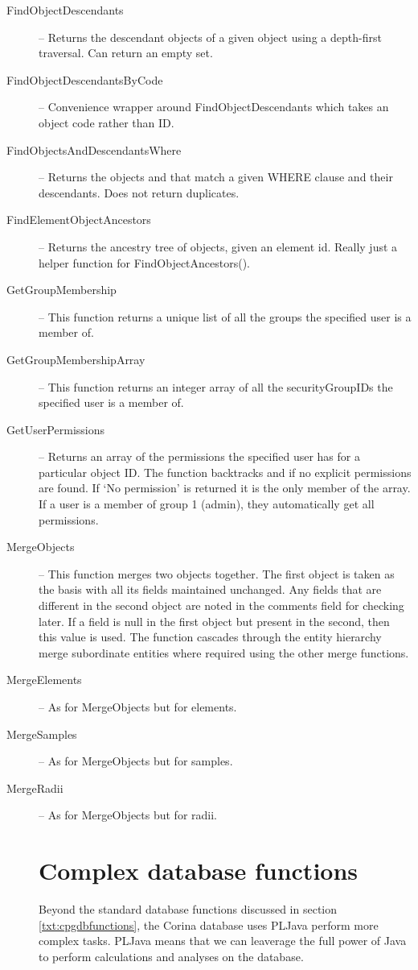 \begin{description}
 \item[FindObjectDescendants] -- Returns the descendant objects of a given object using a depth-first traversal. Can return an empty set. 

 \item[FindObjectDescendantsByCode] -- Convenience wrapper around FindObjectDescendants which takes an object code rather than ID.

 \item[FindObjectsAndDescendantsWhere] -- Returns the objects and that match a given WHERE clause and their descendants. Does not return duplicates. 

 \item[FindElementObjectAncestors] -- Returns the ancestry tree of objects, given an element id. Really just a helper function for FindObjectAncestors(). 

 \item[GetGroupMembership] -- This function returns a unique list of all the groups the specified user is a member of. 

 \item[GetGroupMembershipArray] -- This function returns an integer array of all the securityGroupIDs the specified user is a member of. 

 \item[GetUserPermissions] -- Returns an array of the permissions the specified user has for a particular object ID. The function backtracks  and  if no explicit permissions are found. If `No permission' is returned it is the only member of the array. If a user is a member of group 1 (admin), they automatically get all permissions. 

 \item[MergeObjects] -- This function merges two objects together. The first object is taken as the basis with all its fields maintained unchanged. Any fields that are different in the second object are noted in the comments field for checking later. If a field is null in the first object but present in the second, then this value is used. The function cascades through the entity hierarchy merge subordinate entities where required using the other merge functions. 

 \item[MergeElements] -- As for MergeObjects but for elements.

 \item[MergeSamples] -- As for MergeObjects but for samples.

 \item[MergeRadii] -- As for MergeObjects but for radii.



\section{Complex database functions}
Beyond the standard database functions discussed in section \ref{txt:cpgdbfunctions}, the Corina database uses PLJava perform more complex tasks.  PLJava means that we can leaverage the full power of Java to perform calculations and analyses on the database.  

\end{description}